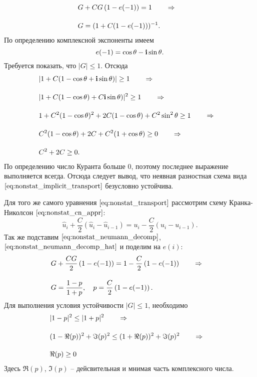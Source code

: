 \begin{align*}
    & G + C G \left(1 - e(-1)\right)= 1 \quad \quad\Rightarrow\quad \\[10pt]
    & G = (1 + C (1 - e(-1)))^{-1}.
\end{align*}
По определению комплексной экспоненты имеем
\begin{equation*}
    e(-1) = \cos \theta - \mathbf{i} \sin\theta.
\end{equation*}
Требуется показать, что $|G| \leq 1$. Отсюда
\begin{align*}
    & |1 + C (1 - \cos\theta + \mathbf{i}\sin\theta)|  \geq 1 \quad \quad\Rightarrow\quad \\[10pt]
    & |1 + C (1 - \cos\theta) + C\mathbf{i}\sin\theta)|^2 \geq 1 \quad \quad\Rightarrow\quad \\[10pt]
    & 1 + C^2(1-\cos\theta)^2 + 2C(1-\cos\theta) + C^2\sin^2\theta \geq 1 \quad \quad\Rightarrow\quad \\[10pt]
    & C^2(1-\cos\theta) + 2C + C^2(1+\cos\theta) \geq 0 \quad \quad\Rightarrow\quad \\[10pt]
    & C^2 + 2C \geq 0.
\end{align*}
По определению число Куранта больше 0, поэтому последнее выражение выполняется всегда.
Отсюда следует вывод, что неявная разностная схема вида $\eqref{eq:nonstat_implicit_transport}$
безусловно устойчива.

\label{sec:NonstatCNConv}

Для того же самого уравнения $\eqref{eq:nonstat_transport}$
рассмотрим схему Кранка-Николсон $\eqref{eq:nonstat_cn_appr}$:
\begin{equation}
    \label{eq:nonstat_cn_transport}
    \hat u_i + \frac{C}{2} \left(\hat u_i - \hat u_{i-1}\right) = u_i - \frac{C}{2} \left(u_i - u_{i-1}\right).
\end{equation}
Так же
подставим $\eqref{eq:nonstat_neumann_decomp}$, $\eqref{eq:nonstat_neumann_decomp_hat}$
и поделим на $e(i)$:
\begin{align*}
    & G + \frac{C G}{2} \left(1 - e(-1)\right) = 1 - \frac{C}{2} \left(1 - e(-1)\right) \quad \quad\Rightarrow\quad \\[10pt]
    & G = \frac{1 - p}{1 + p}, \quad p = \frac{C}{2} \left(1 - e(-1)\right).
\end{align*}
Для выполнения условия устойчивости $|G| \leq 1$, необходимо
\begin{align*}
    & |1-p|^2 \leq |1+p|^2 \quad \quad\Rightarrow\quad \\[10pt]
    & (1 - \Re(p))^2 + \Im(p)^2 \leq (1+\Re(p))^2 + \Im(p)^2  \quad \quad\Rightarrow\quad \\[10pt]
    & \Re(p) \geq 0
\end{align*}
Здесь $\Re(p)$, $\Im(p)$ -- дейсвительная и мнимая часть комплексного числа.

